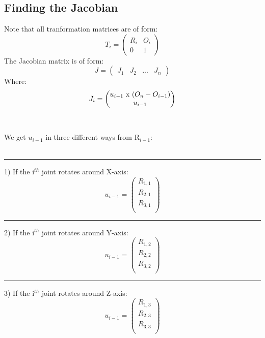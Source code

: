 \documentclass{article}
\begin{document}
\subsection{Finding the Jacobian}
Note that all tranformation matrices are of form:
\begin{equation}
	T_{i} = \begin{pmatrix}
	R_{i}&O_{i}\\
	0&1
	\end{pmatrix}
\end{equation}
The Jacobian matrix is of form: 
 \begin{equation}
	J = \begin{pmatrix}
	J_{1}&J_{2}&...&J_{n}
	\end{pmatrix}
\end{equation}
Where: 
\begin{equation}
J_{i} = \begin{pmatrix}
	u_{i-1} $ x $ (O_{n} - O_{i-1})\\
	u_{i-1}
	\end{pmatrix}
\end{equation}\\\\
We get $u_{i-1}$ in three different ways from R$_{i-1}$:\\\\
\rule{1cm}{0pt} 1) If the i$^{th}$ joint rotates around X-axis: 
\begin{equation}
u_{i-1} = \begin{pmatrix}
	R_{1,1}\\
	R_{2,1}\\
	R_{3,1}\\
	\end{pmatrix}
\end{equation}
\rule{1cm}{0pt} 2) If the i$^{th}$ joint rotates around Y-axis: 
\begin{equation}
u_{i-1} = \begin{pmatrix}
	R_{1,2}\\
	R_{2,2}\\
	R_{3,2}\\
	\end{pmatrix}
\end{equation}
\rule{1cm}{0pt} 3) If the i$^{th}$ joint rotates around Z-axis: 
\begin{equation}
u_{i-1} = \begin{pmatrix}
	R_{1,3}\\
	R_{2,3}\\
	R_{3,3}\\
	\end{pmatrix}
\end{equation}
\end{document}
